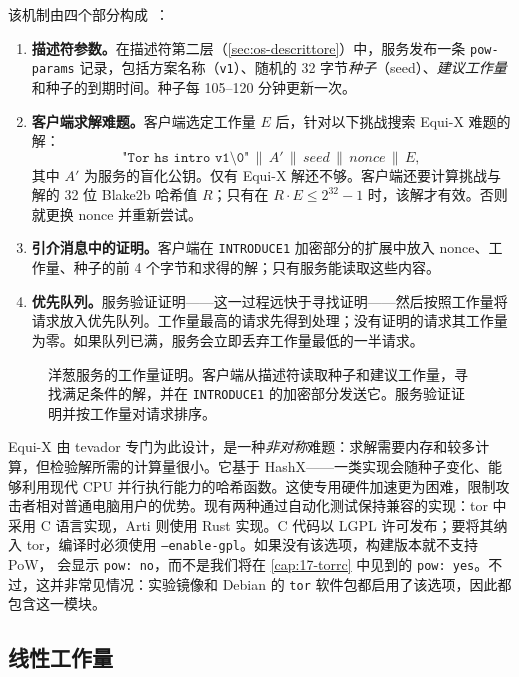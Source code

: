 该机制由四个部分构成~：
\begin{enumerate}
  \item \textbf{描述符参数。}在描述符第二层（\cref{sec:os-descrittore}）中，服务发布一条 \texttt{pow-params} 记录，包括方案名称（\texttt{v1}）、随机的 32 字节\emph{种子}（seed）、\emph{建议工作量}和种子的到期时间。种子每 105--120 分钟更新一次。
  \item \textbf{客户端求解难题。}客户端选定工作量 $E$ 后，针对以下挑战搜索 Equi-X 难题的解：
  \[ \texttt{"Tor hs intro v1\textbackslash 0"} \,\|\, A' \,\|\, \mathit{seed} \,\|\, \mathit{nonce} \,\|\, E, \]
  其中 $A'$ 为服务的盲化公钥。仅有 Equi-X 解还不够。客户端还要计算挑战与解的 32 位 Blake2b 哈希值 $R$；只有在 $R \cdot E \le 2^{32} - 1$ 时，该解才有效。否则就更换 nonce 并重新尝试。
  \item \textbf{引介消息中的证明。}客户端在 \texttt{INTRODUCE1} 加密部分的扩展中放入 nonce、工作量、种子的前 4 个字节和求得的解；只有服务能读取这些内容。
  \item \textbf{优先队列。}服务验证证明——这一过程远快于寻找证明——然后按照工作量将请求放入优先队列。工作量最高的请求先得到处理；没有证明的请求其工作量为零。如果队列已满，服务会立即丢弃工作量最低的一半请求。
\end{enumerate}

\begin{figure}[htbp]
\centering

\caption{洋葱服务的工作量证明。客户端从描述符读取种子和建议工作量，寻找满足条件的解，并在 \texttt{INTRODUCE1} 的加密部分发送它。服务验证证明并按工作量对请求排序。}
\label{fig:pow}
\end{figure}

\begin{approfondimento}
Equi-X 由 tevador 专门为此设计，是一种\emph{非对称}难题：求解需要内存和较多计算，但检验解所需的计算量很小。它基于 HashX——一类实现会随种子变化、能够利用现代 CPU 并行执行能力的哈希函数。这使专用硬件加速更为困难，限制攻击者相对普通电脑用户的优势。现有两种通过自动化测试保持兼容的实现：tor 中采用 C 语言实现，Arti 则使用 Rust 实现。C 代码以 LGPL 许可发布；要将其纳入 tor，编译时必须使用 \texttt{--enable-gpl}。如果没有该选项，构建版本就不支持 PoW， 会显示 \texttt{pow: no}，而不是我们将在 \cref{cap:17-torrc} 中见到的 \texttt{pow: yes}。不过，这并非常见情况：实验镜像和 Debian 的 \texttt{tor} 软件包都启用了该选项，因此都包含这一模块。
\end{approfondimento}

\subsection{线性工作量}

